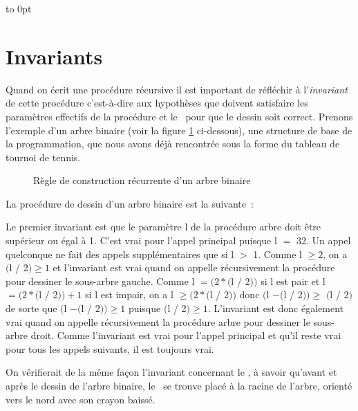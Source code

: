  {
 \vbox to 0pt{\vspace*{3cm}}%
 
 }
\section{Invariants}
Quand on écrit une procédure récursive il est important de réfléchir à l'{\em in\-va\-riant\/} 
de cette procédure c'est-à-dire aux hypothèses que doivent satisfaire les paramètres
effectifs de la procédure et le \robot\ pour que le dessin soit correct. Prenons l'exemple d'un
arbre binaire (voir la figure \ref{fig:arbin} ci-dessous), une structure de base de la
programmation, que nous avons déjà rencontrée sous la forme du tableau de tournoi de tennis. 
\begin{figure}[htbp]
 \caption{Règle de construction récurrente d'un arbre binaire}\label{fig:arbin}
\end{figure}

\noindent La procédure de dessin d'un arbre binaire est la suivante~:



Le premier invariant est que le paramètre {\idt l} de la procédure {\idt arbre} doit être 
supérieur ou égal à 1. C'est
vrai pour l'appel principal puisque {\idt l} $=$ 32. Un appel quelconque
ne fait des appels supplémentaires que si {\idt l} $>$ 1. Comme 
{\idt l} $\geq 2$, on a
$(${\idt l / 2}$) \geq 1$ et l'invariant est vrai quand on appelle récursivement la 
procédure pour dessiner le sous-arbre gauche. Comme 
{\idt l} $= (2 \ast (${\idt l / 2}$))$ 
si {\idt l} est pair et 
{\idt l} $= (2 \ast (${\idt l / 2}$)) + 1$
si {\idt l} est impair, on a
{\idt l} $\geq (2 \ast (${\idt l / 2}$))$ donc 
$(${\idt l} $- (${\idt l / 2}$)) \geq$ $(${\idt l / 2}$)$ de sorte que
$(${\idt l} $- (${\idt l / 2}$)) \geq 1$
puisque $(${\idt l / 2}$) \geq 1$. L'invariant est donc également vrai quand on appelle 
récursivement la 
procédure {\idt arbre} pour dessiner le sous-arbre droit. Comme l'invariant est vrai pour l'appel principal
et qu'il reste vrai pour tous les appels suivants, il est toujours vrai.

On vérifierait de la même façon l'invariant concernant le \robot, à savoir qu'avant et après
le dessin de l'arbre binaire, le \robot\ se trouve placé à la racine de l'arbre, orienté vers le nord avec son
crayon baissé.

